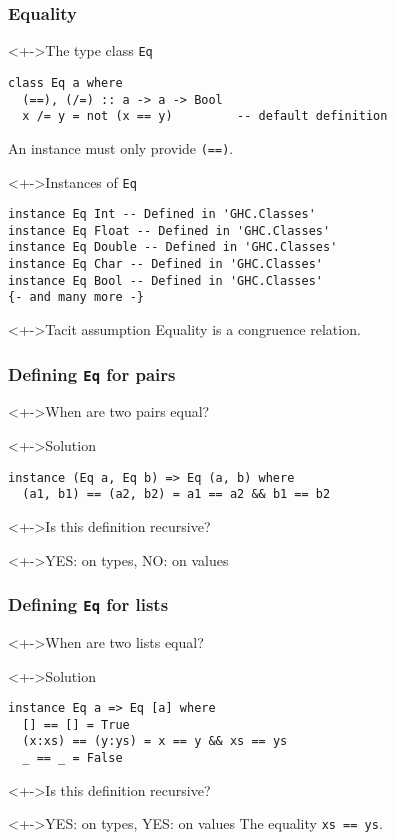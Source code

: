 \documentclass{beamer}
\begin{document}
\begin{frame}[fragile]
  \frametitle{Equality}
  \begin{block}<+->{The type class \texttt{Eq}}
\begin{lstlisting}
class Eq a where
  (==), (/=) :: a -> a -> Bool
  x /= y = not (x == y)         -- default definition
\end{lstlisting}
    An instance must only provide \texttt{(==)}.
  \end{block}
  \begin{block}<+->{Instances of \texttt{Eq}}
\begin{lstlisting}
instance Eq Int -- Defined in 'GHC.Classes'
instance Eq Float -- Defined in 'GHC.Classes'
instance Eq Double -- Defined in 'GHC.Classes'
instance Eq Char -- Defined in 'GHC.Classes'
instance Eq Bool -- Defined in 'GHC.Classes'
{- and many more -}
\end{lstlisting}
  \end{block}
  \begin{exampleblock}<+->{Tacit assumption}
    Equality is a congruence relation.
  \end{exampleblock}
\end{frame}
\begin{frame}[fragile]
  \frametitle{Defining \texttt{Eq} for pairs}
  \begin{block}<+->{When are two pairs equal?}
  \end{block}
  \begin{block}<+->{Solution}
\begin{lstlisting}
instance (Eq a, Eq b) => Eq (a, b) where
  (a1, b1) == (a2, b2) = a1 == a2 && b1 == b2
\end{lstlisting}
  \end{block}
  \begin{block}<+->{Is this definition recursive?}
  \end{block}
  \begin{alertblock}<+->{YES: on types, NO: on values}
  \end{alertblock}
\end{frame}
\begin{frame}[fragile]
  \frametitle{Defining \texttt{Eq} for lists}
  \begin{block}<+->{When are two lists equal?}
  \end{block}
  \begin{block}<+->{Solution}
\begin{lstlisting}
instance Eq a => Eq [a] where
  [] == [] = True
  (x:xs) == (y:ys) = x == y && xs == ys
  _ == _ = False
\end{lstlisting}
  \end{block}
  \begin{block}<+->{Is this definition recursive?}
  \end{block}
  \begin{alertblock}<+->{YES: on types, YES: on values}
    The equality \texttt{xs == ys}.
  \end{alertblock}
\end{frame}
\end{document}
